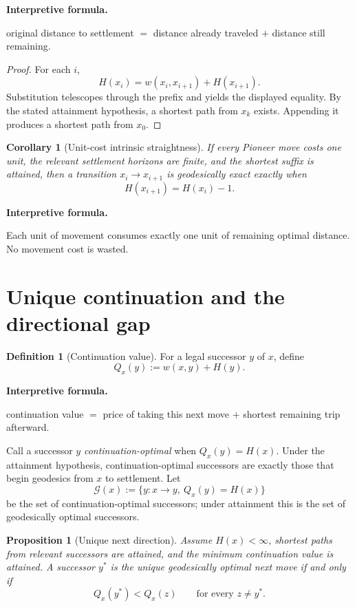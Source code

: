 \documentclass[11pt]{article}
\newtheorem{proposition}[theorem]{Proposition}
\newtheorem{corollary}[theorem]{Corollary}
\theoremstyle{definition}
\newtheorem{definition}[theorem]{Definition}
\theoremstyle{remark}
\newcommand{\Qval}{Q}
\newenvironment{interpretiveformula}{%
  \begin{center}\begin{minipage}{0.92\linewidth}\small
  \textbf{Interpretive formula.}\ \raggedright}{\end{minipage}\end{center}}
\begin{document}
\begin{interpretiveformula}
original distance to settlement $=$ distance already traveled $+$ distance still remaining.
\end{interpretiveformula}

\begin{proof}
For each $i$,
\[
H(x_i)=w(x_i,x_{i+1})+H(x_{i+1}).
\]
Substitution telescopes through the prefix and yields the displayed equality. By the stated attainment hypothesis, a shortest path from $x_k$ exists. Appending it produces a shortest path from $x_0$.
\end{proof}

\begin{corollary}[Unit-cost intrinsic straightness]
If every Pioneer move costs one unit, the relevant settlement horizons are finite, and the shortest suffix is attained, then a transition $x_i\to x_{i+1}$ is geodesically exact exactly when
\[
H(x_{i+1})=H(x_i)-1.
\]
\end{corollary}

\begin{interpretiveformula}
Each unit of movement consumes exactly one unit of remaining optimal distance. No movement cost is wasted.
\end{interpretiveformula}

\section{Unique continuation and the directional gap}

\begin{definition}[Continuation value]
For a legal successor $y$ of $x$, define
\[
\Qval_x(y):=w(x,y)+H(y).
\]
\end{definition}

\begin{interpretiveformula}
continuation value $=$ price of taking this next move $+$ shortest remaining trip afterward.
\end{interpretiveformula}

Call a successor $y$ \emph{continuation-optimal} when $\Qval_x(y)=H(x)$. Under the attainment hypothesis, continuation-optimal successors are exactly those that begin geodesics from $x$ to settlement. Let
\[
\mathcal G(x):=\{y:x\to y,\ \Qval_x(y)=H(x)\}
\]
be the set of continuation-optimal successors; under attainment this is the set of geodesically optimal successors.

\begin{proposition}[Unique next direction]
Assume $H(x)<\infty$, shortest paths from relevant successors are attained, and the minimum continuation value is attained. A successor $y^*$ is the unique geodesically optimal next move if and only if
\[
\Qval_x(y^*)<\Qval_x(z)\qquad\text{for every }z\neq y^*.
\]
\end{proposition}
\end{document}
